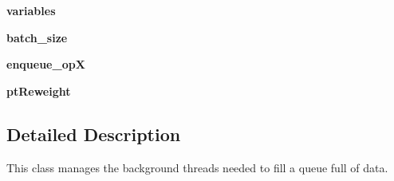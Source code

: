 \begin{DoxyCompactItemize}
\item 
\hypertarget{classCustomQueueRunner_1_1CustomQueueRunner_aa7bb789d918609955e2d755812855b33}{{\bfseries variables}}\label{classCustomQueueRunner_1_1CustomQueueRunner_aa7bb789d918609955e2d755812855b33}

\item 
\hypertarget{classCustomQueueRunner_1_1CustomQueueRunner_aed125859f24c11af006847d8c6613ca3}{{\bfseries batch\-\_\-size}}\label{classCustomQueueRunner_1_1CustomQueueRunner_aed125859f24c11af006847d8c6613ca3}

\item 
\hypertarget{classCustomQueueRunner_1_1CustomQueueRunner_a87afd27e4fba7b890ef7cf7056dd01be}{{\bfseries enqueue\-\_\-op\-X}}\label{classCustomQueueRunner_1_1CustomQueueRunner_a87afd27e4fba7b890ef7cf7056dd01be}

\item 
\hypertarget{classCustomQueueRunner_1_1CustomQueueRunner_aba53122c1cf237949531b1c016628c76}{{\bfseries pt\-Reweight}}\label{classCustomQueueRunner_1_1CustomQueueRunner_aba53122c1cf237949531b1c016628c76}

\end{DoxyCompactItemize}


\subsection{Detailed Description}
\begin{DoxyVerb}This class manages the background threads needed to fill
    a queue full of data.
\end{DoxyVerb}
 

